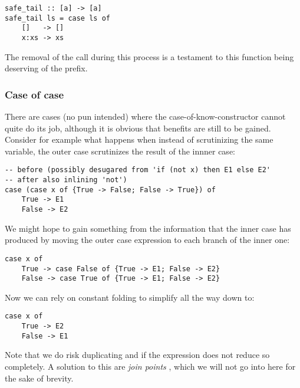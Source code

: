 \begin{listing}[H]
\begin{verbatim}
safe_tail :: [a] -> [a]
safe_tail ls = case ls of
    []   -> []
    x:xs -> xs
\end{verbatim}
\end{listing}

The removal of the call  during this process is a testament to this function being deserving of the  prefix.

\subsubsection{Case of case}

There are cases (no pun intended) where the case-of-know-constructor cannot quite do its job, although it is obvious
that benefits are still to be gained. Consider for example what happens when instead of scrutinizing the same variable,
the outer case scrutinizes the result of the innner case:


\begin{listing}[H]
\begin{verbatim}
-- before (possibly desugared from 'if (not x) then E1 else E2'
-- after also inlining 'not')
case (case x of {True -> False; False -> True}) of
    True -> E1
    False -> E2
\end{verbatim}
\end{listing}

We might hope to gain something from the information that the inner case has produced by moving the outer case expression
to each branch of the inner one:

\begin{listing}[H]
\begin{verbatim}
case x of
    True -> case False of {True -> E1; False -> E2}
    False -> case True of {True -> E1; False -> E2}
\end{verbatim}
\end{listing}

Now we can rely on constant folding to simplify all the way down to:

\begin{listing}[H]
\begin{verbatim}
case x of
    True -> E2
    False -> E1
\end{verbatim}
\end{listing}

Note that we do risk duplicating  and  if the expression does not reduce so completely.
A solution to this are \textit{join points} \cite{compiling_wo_continuations},
which we will not go into here for the sake of brevity.

